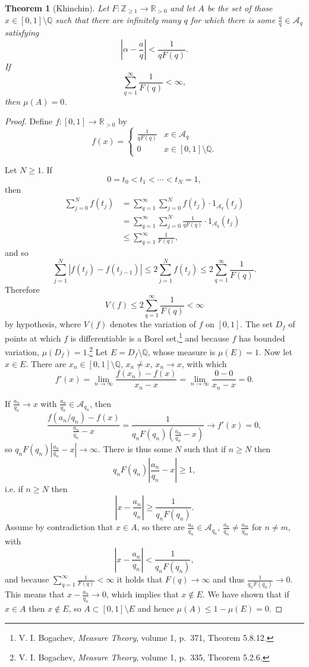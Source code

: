 \documentclass{article}
\newtheorem{theorem}{Theorem}
\theoremstyle{definition}
\begin{document}
\begin{theorem}[Khinchin]
Let $F:\mathbb{Z}_{\geq 1} \to \mathbb{R}_{>0}$ and let $A$ be the set of those $x \in [0,1] \setminus \mathbb{Q}$ such that there are infinitely many 
$q$ for which there is some $\frac{a}{q} \in \mathscr{A}_q$ satisfying
\[
\left|\alpha - \frac{a}{q} \right| < \frac{1}{qF(q)}.
\]
If 
\[
\sum_{q=1}^\infty \frac{1}{F(q)} < \infty,
\]
then $\mu(A)=0$. 
\end{theorem}
\begin{proof}
Define $f:[0,1] \to  \mathbb{R}_{>0}$ by
\[
f(x) = \begin{cases}
\frac{1}{q F(q)}& x \in \mathscr{A}_q\\
0&x  \in [0,1] \setminus \mathbb{Q}.
\end{cases}
\]

Let $N \geq 1$. If
\[
0=t_0<t_1<\cdots<t_N=1,
\]
then
\begin{align*}
\sum_{j=0}^N f(t_j) &= \sum_{q=1}^\infty \sum_{j=0}^N f(t_j) \cdot 1_{\mathscr{A}_q}(t_j)\\
&=\sum_{q=1}^\infty \sum_{j=0}^N \frac{1}{qF(q)} \cdot 1_{\mathscr{A}_q}(t_j)\\
&\leq \sum_{q=1}^\infty \frac{1}{F(q)},
\end{align*}
and so
\[
\sum_{j=1}^N |f(t_j)-f(t_{j-1})| \leq 2 \sum_{j=1}^N f(t_j) \leq 2  \sum_{q=1}^\infty \frac{1}{F(q)}.
\]
Therefore
\[
V(f) \leq  2  \sum_{q=1}^\infty \frac{1}{F(q)}<\infty
\]
by  hypothesis,
where $V(f)$ denotes the variation of $f$ on $[0,1]$.
The set $D_f$ of points at which $f$ is differentiable is a Borel set,\footnote{V. I. Bogachev,
{\em Measure Theory}, volume 1, p.~371, Theorem 5.8.12.}
and because $f$ has bounded variation,
 $\mu(D_f)=1$.\footnote{V. I. Bogachev, {\em Measure Theory}, volume 1, p.~335, Theorem 5.2.6.}
 Let $E = D_f \setminus \mathbb{Q}$, whose measure is $\mu(E)=1$. 
Now let $x \in E$. There are $x_n \in [0,1] \setminus \mathbb{Q}$, $x_n \neq x$, $x_n \to x$, with which
\[
f'(x) = \lim_{n \to \infty} \frac{f(x_n)-f(x)}{x_n-x} = \lim_{n \to \infty} \frac{0-0}{x_n-x} = 0.
\] 

If
$\frac{a_n}{q_n} \to x$ with $\frac{a_n}{q_n} \in \mathscr{A}_{q_n}$, then
\[
\frac{f(a_n/q_n) - f(x)}{\frac{a_n}{q_n}-x} = \frac{1}{q_n F(q_n)\left(\frac{a_n}{q_n}-x\right)} \to f'(x) = 0,
\]
so $q_n F(q_n)\left|\frac{a_n}{q_n}-x\right| \to \infty$.
There is thus some $N$ such that if $n \geq N$ then
\[
q_n F(q_n)\left|\frac{a_n}{q_n}-x\right| \geq 1,
\]
i.e. if $n \geq N$ then 
\[
\left|x- \frac{a_n}{q_n}\right| \geq \frac{1}{q_n F(q_n)}.
\]
Assume by contradiction that $x \in A$, so there are $\frac{a_n}{q_n} \in \mathscr{A}_{q_n}$, $\frac{a_n}{q_n} \neq \frac{a_m}{q_m}$ for $n \neq m$, with 
\[
\left| x- \frac{a_n}{q_n} \right| < \frac{1}{q_n F(q_n)},
\]
and because $\sum_{q=1}^\infty \frac{1}{F(q)}<\infty$ it holds that $F(q) \to \infty$ and thus
$\frac{1}{q_n F(q_n)} \to 0$. This means that $x - \frac{a_n}{q_n} \to 0$, which implies 
that $x \notin E$. We have shown that if $x \in A$ then $x \notin E$, so $A \subset [0,1] \setminus E$ and hence
$\mu(A) \leq 1-\mu(E)=0$. 
\end{proof}
\end{document}

